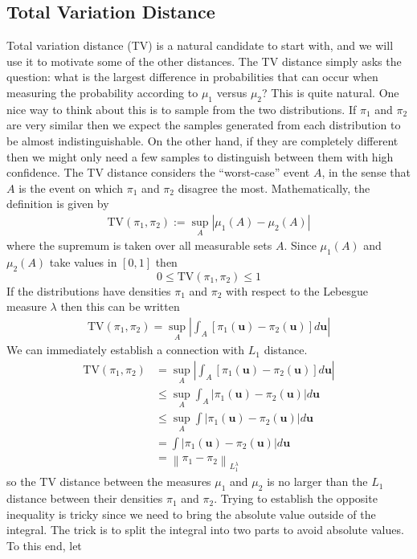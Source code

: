 \documentclass[12pt]{article}
\newcommand{\bpar}{\mathbf{u}} %
\newcommand*{\norm}[1]{\left\lVert#1\right\rVert}
\newcommand*{\abs}[1]{\left\lvert#1\right\rvert}
\begin{document}
\subsection{Total Variation Distance}
Total variation distance (TV) is a natural candidate to start with, and we will use it to motivate some of the other distances. The TV distance simply asks the question: what is the largest difference in probabilities that can occur when measuring the probability according to $\mu_1$ versus $\mu_2$? This is quite natural. One nice way to think about this is to sample from the 
two distributions. If $\pi_1$ and $\pi_2$ are very similar then we expect the samples generated from each distribution to be almost indistinguishable. On the other hand, if they are completely 
different then we might only need a few samples to distinguish between them with high confidence. The TV distance considers the ``worst-case'' event $A$, in the sense that $A$ is the event 
on which $\pi_1$ and $\pi_2$ disagree the most. Mathematically, the definition is given by 
\begin{align*}
\text{TV}(\pi_1, \pi_2) := \sup_{A} \abs{\mu_1(A) - \mu_2(A)}
\end{align*}
where the supremum is taken over all measurable sets $A$. Since $\mu_1(A)$ and $\mu_2(A)$ take values in $[0, 1]$ then 
\[0 \leq \text{TV}(\pi_1, \pi_2) \leq 1\]
If the distributions have densities $\pi_1$ and $\pi_2$ with respect to the Lebesgue measure $\lambda$ then this can be 
written 
\begin{align*}
\text{TV}(\pi_1, \pi_2) = \sup_{A} \abs{\int_A \left[\pi_1(\bpar) - \pi_2(\bpar)\right] d\bpar }
\end{align*}
We can immediately establish a connection with $L_1$ distance. 
\begin{align*}
\text{TV}(\pi_1, \pi_2) &= \sup_{A} \abs{\int_A \left[\pi_1(\bpar) - \pi_2(\bpar)\right] d\bpar } \\
				 &\leq \sup_{A} \int_A \abs{\pi_1(\bpar) - \pi_2(\bpar)} d\bpar \\
				 &\leq \sup_{A} \int \abs{\pi_1(\bpar) - \pi_2(\bpar)} d\bpar \\
				 &= \int \abs{\pi_1(\bpar) - \pi_2(\bpar)} d\bpar \\
				 &= \norm{\pi_1 - \pi_2}_{L_1^\lambda}
\end{align*}
so the TV distance between the measures $\mu_1$ and $\mu_2$ is no larger than the $L_1$ distance between their densities $\pi_1$ and $\pi_2$. Trying to establish the opposite 
inequality is tricky since we need to bring the absolute value outside of the integral. The trick is to split the integral into two parts to avoid absolute values. To this end, let 
\end{document}
